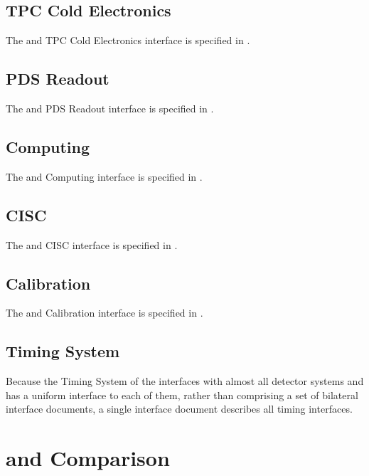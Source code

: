\subsection{TPC Cold Electronics}
The  and TPC Cold Electronics interface is specified in \cite{docid-6742}.
\subsection{PDS Readout}
The  and PDS Readout interface is specified in \cite{docid-6727}.
\subsection{Computing}
The  and Computing interface is specified in \cite{docid-7123}.
\subsection{CISC}
\label{sec:sp-daq:interfaces-cisc}
The  and CISC interface is specified in \cite{docid-6790}.
\subsection{Calibration}
The  and Calibration interface is specified in \cite{docid-7069}.
\subsection{Timing System}
Because the Timing System of the   interfaces with
almost all detector systems and has a uniform interface to each of
them, rather than comprising a set of 
bilateral interface documents, a single interface document
\cite{docid-11224} describes all timing interfaces. 

\section{ and  Comparison}


